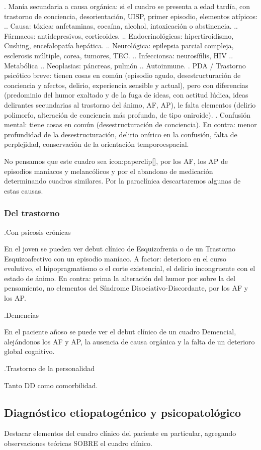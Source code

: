. Manía secundaria a causa orgánica: si el cuadro se presenta a edad tardía, con trastorno de conciencia, desorientación, UISP, primer episodio, elementos atípicos:
.. Causa: tóxica: anfetaminas, cocaína, alcohol, intoxicación o abstinencia.
.. Fármacos: antidepresivos, corticoides.
.. Endocrinológicas: hipertiroidismo, Cushing, encefalopatía hepática.
.. Neurológica: epilepsia parcial compleja, esclerosis múltiple, corea, tumores, TEC.
.. Infeccionsa: neurosífilis, HIV
.. Metabólica
.. Neoplasias: páncreas, pulmón
.. Autoinmune.
. PDA / Trastorno psicótico breve: tienen cosas en común (episodio agudo, desestructuración de conciencia y afectos, delirio, experiencia sensible y actual), pero con diferencias (predominio del humor exaltado y de la fuga de ideas, con actitud lúdica, ideas delirantes secundarias al trastorno del ánimo, AF, AP), le falta elementos (delirio polimorfo, alteración de conciencia más profunda, de tipo oniroide).
. Confusión mental: tiene cosas en común (desestructuración de conciencia). En contra: menor profundidad de la desestructuración, delirio onírico en la confusión, falta de perplejidad, conservación de la orientación temporoespacial.

No pensamos que este cuadro sea icon:paperclip[], por los AF, los AP de episodios maníacos y melancólicos y por el abandono de medicación determinando cuadros similares. Por la paraclínica descartaremos algunas de estas causas.
\subsubsection*{Del trastorno}
.Con psicosis crónicas

En el joven se pueden ver debut clínico de Esquizofrenia o de un Trastorno Esquizoafectivo con un episodio maníaco. A factor: deterioro en el curso evolutivo, el hipopragmatismo o el corte existencial, el delirio incongruente con el estado de ánimo. En contra: prima la alteración del humor por sobre la del pensamiento, no elementos del Síndrome Disociativo-Discordante, por los AF y los AP.

.Demencias

En el paciente añoso se puede ver el debut clínico de un cuadro Demencial, alejándonos los AF y AP, la ausencia de causa orgánica y la falta de un deterioro global cognitivo.

.Trastorno de la personalidad

Tanto DD como comorbilidad.
\subsection*{Diagnóstico etiopatogénico y psicopatológico}
Destacar elementos del cuadro clínico del paciente en particular, agregando observaciones teóricas SOBRE el cuadro clínico.
